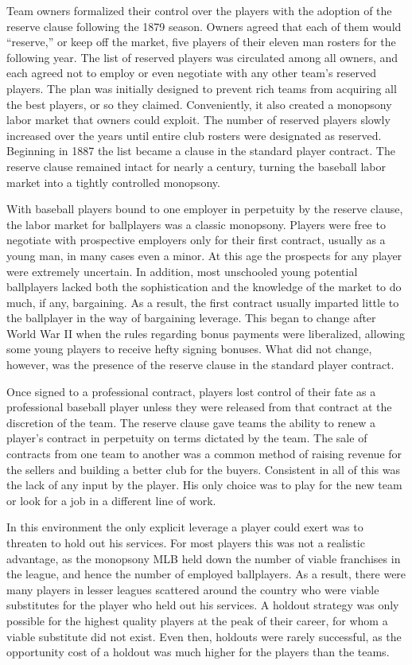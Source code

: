 \documentclass[12pt]{article}
\begin{document}
Team owners formalized their control over the players with the adoption of the reserve clause following the 1879 season.  Owners agreed that each of them would ``reserve,'' or keep off the market, five players of their eleven man rosters for the following year.  The list of reserved players was circulated among all owners, and each agreed not to employ or even negotiate with any other team's reserved players.  The plan was initially designed to prevent rich teams from acquiring all the best players, or so they claimed.  Conveniently, it also created a monopsony labor market that owners could exploit.  The number of reserved players slowly increased over the years until entire club rosters were designated as reserved.  Beginning in 1887 the list became a clause in the standard player contract.  The reserve clause remained intact for nearly a century, turning the baseball labor market into a tightly controlled monopsony.

With baseball players bound to one employer in perpetuity by the reserve clause, the labor market for ballplayers was a classic monopsony.  Players were free to negotiate with prospective employers only for their first contract, usually as a young man, in many cases even a minor.  At this age the prospects for any player were extremely uncertain.  In addition, most unschooled young potential ballplayers lacked both the sophistication and the knowledge of the market to do much, if any, bargaining.  As a result, the first contract usually imparted little to the ballplayer in the way of bargaining leverage.  This began to change after World War II when the rules regarding bonus payments were liberalized, allowing some young players to receive hefty signing bonuses.  What did not change, however, was the presence of the reserve clause in the standard player contract.

Once signed to a professional contract, players lost control of their fate as a professional baseball player unless they were released from that contract at the discretion of the team.  The reserve clause gave teams the ability to renew a player's contract in perpetuity on terms dictated by the team.  The sale of contracts from one team to another was a common method of raising revenue for the sellers and building a better club for the buyers.  Consistent in all of this was the lack of any input by the player.  His only choice was to play for the new team or look for a job in a different line of work.

In this environment the only explicit leverage a player could exert was to threaten to hold out his services.  For most players this was not a realistic advantage, as the monopsony MLB held down the number of viable franchises in the league, and hence the number of employed ballplayers.  As a result, there were many players in lesser leagues scattered around the country who were viable substitutes for the player who held out his services.  A holdout strategy was only possible for the highest quality players at the peak of their career, for whom a viable substitute did not exist.  Even then, holdouts were rarely successful, as the opportunity cost of a holdout was much higher for the players than the teams.    
\end{document}
